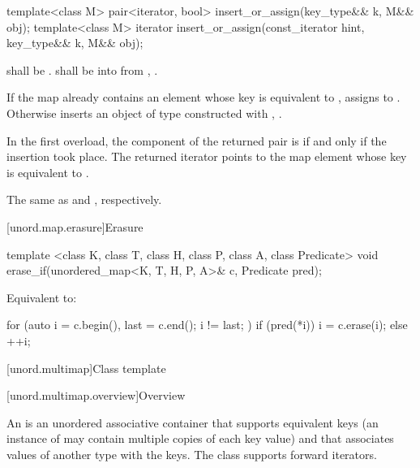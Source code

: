 %
\begin{itemdecl}
template<class M>
  pair<iterator, bool> insert_or_assign(key_type&& k, M&& obj);
template<class M>
  iterator insert_or_assign(const_iterator hint, key_type&& k, M&& obj);
\end{itemdecl}

\begin{itemdescr}
\pnum
\requires
{} shall be .
 shall be  into 
from , .

\pnum
\effects
If the map already contains an element 
whose key is equivalent to ,
assigns  to .
Otherwise inserts an object of type 
constructed with , .

\pnum
\returns
In the first overload,
the  component of the returned pair is 
if and only if the insertion took place.
The returned iterator points to the map element
whose key is equivalent to .

\pnum
\complexity
The same as  and ,
respectively.
\end{itemdescr}

[unord.map.erasure]{Erasure}

%
\begin{itemdecl}
template <class K, class T, class H, class P, class A, class Predicate>
  void erase_if(unordered_map<K, T, H, P, A>& c, Predicate pred);
\end{itemdecl}

\begin{itemdescr}
\pnum
\effects
Equivalent to:
\begin{codeblock}
for (auto i = c.begin(), last = c.end(); i != last; ) {
  if (pred(*i)) {
    i = c.erase(i);
  } else {
    ++i;
  }
}
\end{codeblock}
\end{itemdescr}

[unord.multimap]{Class template }%

[unord.multimap.overview]{Overview}

\pnum
{}%
%
An  is an unordered associative container
that supports equivalent keys (an instance of  may contain
multiple copies of each key value) and that associates values of
another type  with the keys.
The  class
supports forward iterators.

